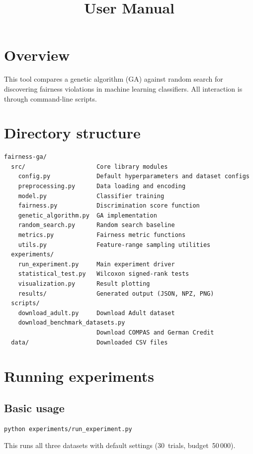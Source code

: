 \documentclass[10pt]{article}
\title{User Manual}
\author{}
\date{}
\begin{document}
\maketitle

\section{Overview}

This tool compares a genetic algorithm (GA) against random search for discovering
fairness violations in machine learning classifiers.  All interaction is through
command-line scripts.

\section{Directory structure}

\begin{verbatim}
fairness-ga/
  src/                    Core library modules
    config.py             Default hyperparameters and dataset configs
    preprocessing.py      Data loading and encoding
    model.py              Classifier training
    fairness.py           Discrimination score function
    genetic_algorithm.py  GA implementation
    random_search.py      Random search baseline
    metrics.py            Fairness metric functions
    utils.py              Feature-range sampling utilities
  experiments/
    run_experiment.py     Main experiment driver
    statistical_test.py   Wilcoxon signed-rank tests
    visualization.py      Result plotting
    results/              Generated output (JSON, NPZ, PNG)
  scripts/
    download_adult.py     Download Adult dataset
    download_benchmark_datasets.py
                          Download COMPAS and German Credit
  data/                   Downloaded CSV files
\end{verbatim}

\section{Running experiments}

\subsection{Basic usage}

\begin{verbatim}
python experiments/run_experiment.py
\end{verbatim}

This runs all three datasets with default settings (30~trials, budget~50\,000).
\end{document}
